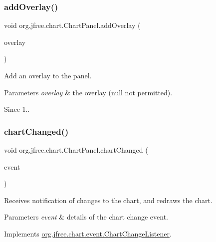 \subsubsection{\texorpdfstring{add\+Overlay()}{addOverlay()}}
{\footnotesize\ttfamily void org.\+jfree.\+chart.\+Chart\+Panel.\+add\+Overlay (\begin{DoxyParamCaption}\item[{\mbox{\hyperlink{interfaceorg_1_1jfree_1_1chart_1_1panel_1_1_overlay}{Overlay}}}]{overlay }\end{DoxyParamCaption})}

Add an overlay to the panel.


\begin{DoxyParams}{Parameters}
{\em overlay} & the overlay ({\ttfamily null} not permitted).\\
\hline
\end{DoxyParams}
\begin{DoxySince}{Since}
1.. 
\end{DoxySince}
\mbox{\label{classorg_1_1jfree_1_1chart_1_1_chart_panel_a872d3011111149268824719983f616c7}} 
\subsubsection{\texorpdfstring{chart\+Changed()}{chartChanged()}}
{\footnotesize\ttfamily void org.\+jfree.\+chart.\+Chart\+Panel.\+chart\+Changed (\begin{DoxyParamCaption}\item[{\mbox{\hyperlink{classorg_1_1jfree_1_1chart_1_1event_1_1_chart_change_event}{Chart\+Change\+Event}}}]{event }\end{DoxyParamCaption})}

Receives notification of changes to the chart, and redraws the chart.


\begin{DoxyParams}{Parameters}
{\em event} & details of the chart change event. \\
\hline
\end{DoxyParams}


Implements \mbox{\hyperlink{interfaceorg_1_1jfree_1_1chart_1_1event_1_1_chart_change_listener_ac4ad92c4f9cc7be26964dab79d882bee}{org.\+jfree.\+chart.\+event.\+Chart\+Change\+Listener}}.

